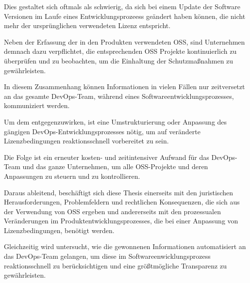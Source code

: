 Dies gestaltet sich oftmals als schwierig, da sich bei einem Update der Software Versionen im Laufe eines Entwicklungsprozeess geändert haben können, die nicht mehr der ursprünglichen verwendeten Lizenz entspricht.

Neben der Erfassung der in den Produkten verwendeten OSS, sind Unternehmen demnach dazu verpflichtet, die entsprechenden OSS Projekte kontinuierlich zu überprüfen und zu beobachten, um die Einhaltung der Schutzmaßnahmen zu gewährleisten.

In diesem Zusammenhang können Informationen in vielen Fällen nur zeitversetzt an das gesamte DevOps-Team, während eines Softwareentwicklungsprozesses, kommuniziert werden.

Um dem entgegenzuwirken, ist eine Umstrukturierung oder Anpassung des gängigen DevOps-Entwicklungsprozesses nötig, um auf veränderte Lizenzbedingungen reaktionsschnell vorbereitet zu sein.

Die Folge ist ein erneuter kosten- und zeitintensiver Aufwand für das DevOps-Team und das ganze Unternehmen, um alle OSS-Projekte und deren Anpassungen zu steuern und zu kontrollieren. 

Daraus ableitend, beschäftigt sich diese Thesis einerseits mit den juristischen Herausforderungen, Problemfeldern und rechtlichen Konsequenzen, die sich aus der Verwendung von OSS ergeben und andererseits mit den prozessualen Veränderungen im Produktentwicklungsprozesses, die bei einer Anpassung von Lizenzbedingungen, benötigt werden. 

Gleichzeitig wird untersucht, wie die gewonnenen Informationen automatisiert an das DevOps-Team gelangen, um diese im Softwareenwicklungsprozess reaktionsschnell zu berücksichtigen und eine größtmögliche Transparenz zu gewährleisten.  


